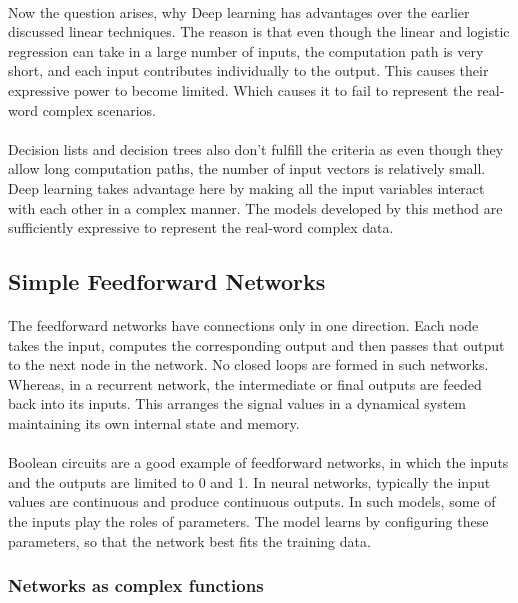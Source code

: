 \documentclass{article}
\begin{document}
  \paragraph{} Now the question arises, why Deep learning has advantages over the earlier discussed linear techniques. The reason is that even though the linear and logistic regression can take in a large number of inputs, the computation path is very short, and each input contributes individually to the output. This causes their expressive power to become limited. Which causes it to fail to represent the real-word complex scenarios.
  \paragraph{} Decision lists and decision trees also don’t fulfill the criteria as even though they allow long computation paths, the number of input vectors is relatively small. Deep learning takes advantage here by making all the input variables interact with each other in a complex manner. The models developed by this method are sufficiently expressive to represent the real-word complex data.
  
  \subsection{Simple Feedforward Networks}
    \paragraph{} The feedforward networks have connections only in one direction. Each node takes the input, computes the corresponding output and then passes that output to the next node in the network. No closed loops are formed in such networks. Whereas, in a recurrent network, the intermediate or final outputs are feeded back into its inputs. This arranges the signal values in a dynamical system maintaining its own internal state and memory.
    \paragraph{} Boolean circuits are a good example of feedforward networks, in which the inputs and the outputs are limited to 0 and 1. In neural networks, typically the input values are continuous and produce continuous outputs. In such models, some of the inputs play the roles of parameters. The model learns by configuring these parameters, so that the network best fits the training data.
    \subsubsection{Networks as complex functions}
\end{document}
